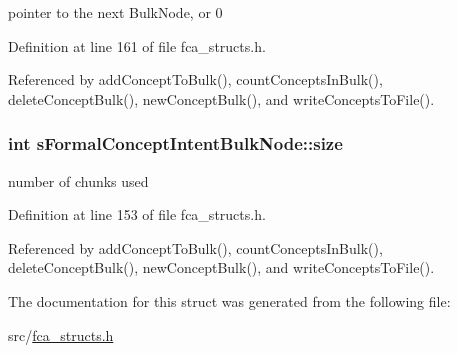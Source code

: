 pointer to the next \-Bulk\-Node, or 0 



\-Definition at line 161 of file fca\-\_\-structs.\-h.



\-Referenced by add\-Concept\-To\-Bulk(), count\-Concepts\-In\-Bulk(), delete\-Concept\-Bulk(), new\-Concept\-Bulk(), and write\-Concepts\-To\-File().

\hypertarget{structsFormalConceptIntentBulkNode_afc96b660c7becf5517e4391846e0975f}{
\subsubsection[{size}]{\setlength{\rightskip}{0pt plus 5cm}int {\bf s\-Formal\-Concept\-Intent\-Bulk\-Node\-::size}}}\label{structsFormalConceptIntentBulkNode_afc96b660c7becf5517e4391846e0975f}


number of chunks used 



\-Definition at line 153 of file fca\-\_\-structs.\-h.



\-Referenced by add\-Concept\-To\-Bulk(), count\-Concepts\-In\-Bulk(), delete\-Concept\-Bulk(), new\-Concept\-Bulk(), and write\-Concepts\-To\-File().



\-The documentation for this struct was generated from the following file\-:\begin{DoxyCompactItemize}
\item 
src/\hyperlink{fca__structs_8h}{fca\-\_\-structs.\-h}\end{DoxyCompactItemize}
